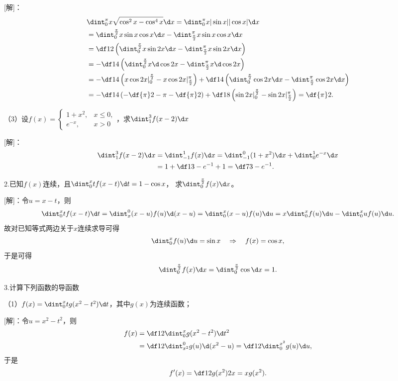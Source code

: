 [解]：
\begin{align*}
	&\dint_0^{\pi}x\sqrt{\cos^2x-\cos^4x}\d x
	=\dint_0^{\pi}x|\sin x||\cos x|\d x\\
	&=\dint_0^{\frac{\pi}2}x\sin x\cos x\d x
	-\dint_{\frac{\pi}2}^{\pi}x\sin x\cos x\d x\\
	&=\df12\left(\dint_0^{\frac{\pi}2}x\sin2x\d x
	-\dint_{\frac{\pi}2}^{\pi}x\sin2x\d x\right)\\
	&=-\df14\left(\dint_0^{\frac{\pi}2}x\d\cos2x
	-\dint_{\frac{\pi}2}^{\pi}x\d\cos2x\right)\\
	&=-\df14\left(x\cos2x|_0^{\frac{\pi}2}
	-x\cos2x|_{\frac{\pi}2}^{\pi}\right)+
	\df14\left(\dint_0^{\frac{\pi}2}\cos2x\d x
	-\dint_{\frac{\pi}2}^{\pi}\cos2x\d x\right)\\
	&=-\df14\left(-\df{\pi}2-\pi-\df{\pi}2\right)
	+\df18\left(\sin2x|_0^{\frac{\pi}2}
	-\sin2x|_{\frac{\pi}2}^{\pi}\right)=\df{\pi}2.
\end{align*}

（3）设$f(x)=\left\{\begin{array}{ll}
	1+x^2, & x\leq0,\\ e^{-x}, & x>0
\end{array}\right.$，求$\dint_1^3f(x-2)\d x$

[解]：
\begin{align*}
	\dint_1^3f(x-2)\d x
	&=\dint_{-1}^1f(x)\d x
	=\dint_{-1}^0(1+x^2)\d x+\dint_0^1e^{-x}\d x\\
	&=1+\df13-e^{-1}+1=\df73-e^{-1}.
\end{align*}
\fin

\bs

2.已知$f(x)$连续，且$\dint_0^xtf(x-t)\d t=1-\cos x$，
求$\dint_0^{\frac{\pi}2}f(x)\d x$。

[解]：令$u=x-t$，则
$$\dint_0^xtf(x-t)\d t=\dint_x^0(x-u)f(u)\d(x-u)
=\dint_0^x(x-u)f(u)\d u=x\dint_0^xf(u)\d u-\dint_0^xuf(u)\d u.$$
故对已知等式两边关于$x$连续求导可得
$$\dint_0^xf(u)\d u=\sin x
\quad\Rightarrow\quad
f(x)=\cos x,$$
于是可得
$$\dint_0^{\frac{\pi}2}f(x)\d x=\dint_0^{\frac{\pi}2}\cos\d x=1.$$
\fin

\bs

3.计算下列函数的导函数

（1）$f(x)=\dint_0^xtg(x^2-t^2)\d t$，其中$g(x)$为连续函数；

[解]：令$u=x^2-t^2$，则
\begin{align*}
	f(x)&=\df12\dint_0^xg(x^2-t^2)\d t^2\\
	&=\df12\dint_{x^2}^0g(u)\d(x^2-u)
	=\df12\dint_0^{x^2}g(u)\d u,
\end{align*}
于是
$$f'(x)=\df12g(x^2)2x=xg(x^2).$$

